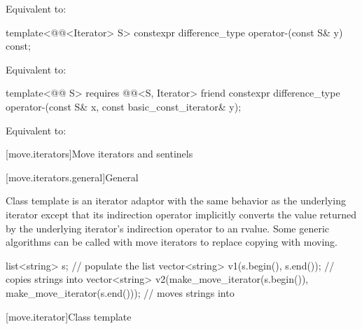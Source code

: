 \begin{itemdescr}
\pnum
\effects
Equivalent to: 
\end{itemdescr}

%
\begin{itemdecl}
template<@@<Iterator> S>
  constexpr difference_type operator-(const S& y) const;
\end{itemdecl}

\begin{itemdescr}
\pnum
\effects
Equivalent to: 
\end{itemdescr}

%
\begin{itemdecl}
template<@@ S>
  requires @@<S, Iterator>
  friend constexpr difference_type operator-(const S& x, const basic_const_iterator& y);
\end{itemdecl}

\begin{itemdescr}
\pnum
\effects
Equivalent to: 
\end{itemdescr}

[move.iterators]{Move iterators and sentinels}

[move.iterators.general]{General}

\pnum
Class template  is an iterator adaptor
with the same behavior as the underlying iterator except that its
indirection operator implicitly converts the value returned by the
underlying iterator's indirection operator to an rvalue.
Some generic algorithms can be called with move iterators to replace
copying with moving.

\pnum
\begin{example}
\begin{codeblock}
list<string> s;
// populate the list 
vector<string> v1(s.begin(), s.end());          // copies strings into 
vector<string> v2(make_move_iterator(s.begin()),
                  make_move_iterator(s.end())); // moves strings into 
\end{codeblock}

\end{example}

[move.iterator]{Class template }

